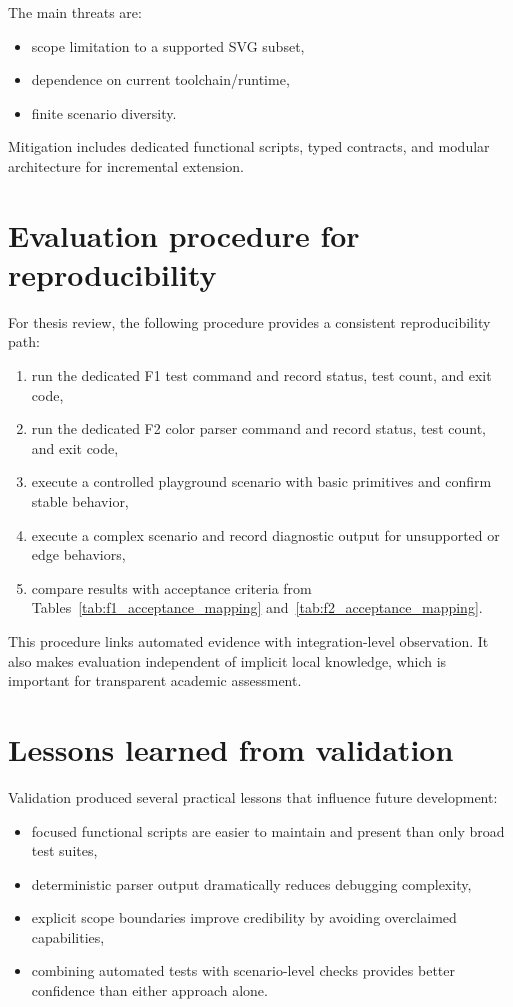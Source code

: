 The main threats are:

\begin{itemize}
\item scope limitation to a supported SVG subset,
\item dependence on current toolchain/runtime,
\item finite scenario diversity.
\end{itemize}

Mitigation includes dedicated functional scripts, typed contracts, and modular architecture for incremental extension.

\section{Evaluation procedure for reproducibility}

For thesis review, the following procedure provides a consistent reproducibility path:

\begin{enumerate}
\item run the dedicated F1 test command and record status, test count, and exit code,
\item run the dedicated F2 color parser command and record status, test count, and exit code,
\item execute a controlled playground scenario with basic primitives and confirm stable behavior,
\item execute a complex scenario and record diagnostic output for unsupported or edge behaviors,
\item compare results with acceptance criteria from Tables~\ref{tab:f1_acceptance_mapping} and~\ref{tab:f2_acceptance_mapping}.
\end{enumerate}

This procedure links automated evidence with integration-level observation.
It also makes evaluation independent of implicit local knowledge, which is important for transparent academic assessment.

\section{Lessons learned from validation}

Validation produced several practical lessons that influence future development:

\begin{itemize}
\item focused functional scripts are easier to maintain and present than only broad test suites,
\item deterministic parser output dramatically reduces debugging complexity,
\item explicit scope boundaries improve credibility by avoiding overclaimed capabilities,
\item combining automated tests with scenario-level checks provides better confidence than either approach alone.
\end{itemize}

